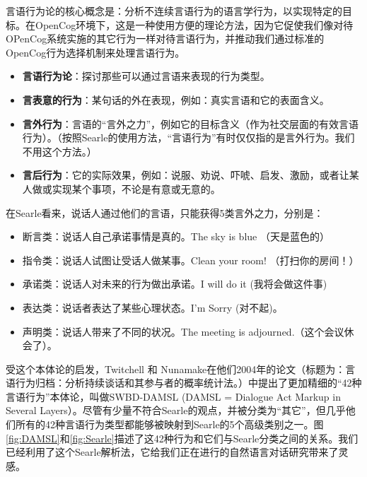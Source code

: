 言语行为论的核心概念是：分析不连续言语行为的语言学行为，以实现特定的目标。在OpenCog环境下，这是一种使用方便的理论方法，因为它促使我们像对待OPenCog系统实施的其它行为一样对待言语行为，并推动我们通过标准的OpenCog行为选择机制来处理言语行为。

\begin{itemize}
\item {\bf 言语行为论}：探讨那些可以通过言语来表现的行为类型。
\item {\bf 言表意的行为}：某句话的外在表现，例如：真实言语和它的表面含义。
\item {\bf 言外行为}：言语的“言外之力”，例如它的目标含义（作为社交层面的有效言语行为）。（按照Searle的使用方法，“言语行为”有时仅仅指的是言外行为。我们不用这个方法。）
\item {\bf 言后行为}：它的实际效果，例如：说服、劝说、吓唬、启发、激励，或者让某人做或实现某个事项，不论是有意或无意的。
\end{itemize}

在Searle看来，说话人通过他们的言语，只能获得5类言外之力，分别是：

\begin{itemize}
\item 断言类：说话人自己承诺事情是真的。The sky is blue （天是蓝色的）
\item 指令类：说话人试图让受话人做某事。Clean your room! （打扫你的房间！）
\item 承诺类：说话人对未来的行为做出承诺。I will do it (我将会做这件事)
\item 表达类：说话者表达了某些心理状态。I’m Sorry (对不起)。
\item 声明类：说话人带来了不同的状况。The meeting is adjourned.（这个会议休会了）。
\end{itemize}

受这个本体论的启发，Twitchell 和 Nunamake在他们2004年的论文（标题为：言语行为归档：分析持续谈话和其参与者的概率统计法。\cite{Twitchell2004}）中提出了更加精细的“42种言语行为”本体论，叫做SWBD-DAMSL (DAMSL = Dialogue Act Markup in Several Layers）。尽管有少量不符合Searle的观点，并被分类为“其它”，但几乎他们所有的42种言语行为类型都能够被映射到Searle的5个高级类别之一。图\ref{fig:DAMSL}和\ref{fig:Searle}描述了这42种行为和它们与Searle分类之间的关系。我们已经利用了这个Searle解析法，它给我们正在进行的自然语言对话研究带来了灵感。

